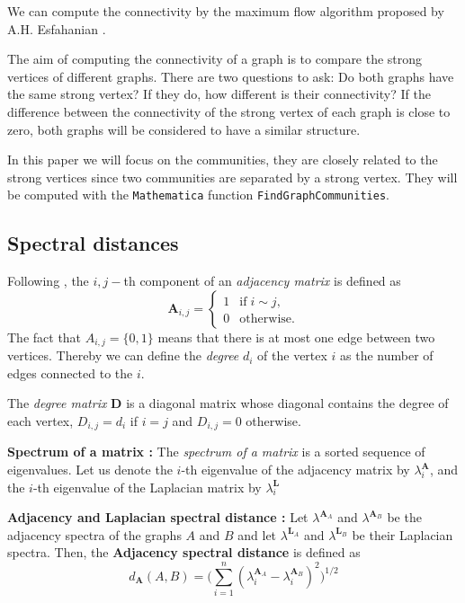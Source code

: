 \documentclass[english, 12pt]{article}
\begin{document}
We can compute the connectivity by the maximum flow algorithm proposed by A.H. Esfahanian \cite[Algorithm 11]{2013Esfahanian}.

The aim of computing the connectivity of a graph is to compare the strong vertices of different graphs. There are two questions to ask:
Do both graphs have the same strong vertex? If they do, how different is their connectivity?
If the difference between the connectivity of the strong vertex of each graph is close to zero, both graphs will be considered to have a similar structure.

In this paper we will focus on the communities, they are closely related to the strong vertices since two communities are separated by a strong vertex. They will be computed with the \texttt{Mathematica} function \texttt{FindGraphCommunities}.

\subsection{Spectral distances}

Following \cite{2020Wills}, the $i,j-$th component of an {\it adjacency matrix} is defined as
$$\mathbf A_{i,j} = \begin{cases}1&\text{if}\; i\sim j,\\0&\text{otherwise.}\end{cases}$$
The fact that $A_{i,j} = \{0,1\}$ means that there is at most one edge between two vertices. Thereby we can define the {\it degree} $d_i$ of the vertex $i$ as the number of edges connected to the $i$.

The {\it degree matrix} $\mathbf D$ is a diagonal matrix whose diagonal contains the degree of each vertex, $ D_{i,j} = d_{i}$ if $i = j$ and $ D_{i,j}  = 0$ otherwise.

{\bf Spectrum of a matrix :} The {\it spectrum of a matrix} is a sorted sequence of eigenvalues.
Let us denote the $i$-th eigenvalue of the adjacency matrix by $\lambda_i^{\mathbf A}$, and the $i$-th eigenvalue of the Laplacian matrix by $\lambda_i^{\mathbf L}$

{\bf Adjacency and Laplacian spectral distance :} Let $\lambda^{\mathbf A_A}$ and  $\lambda^{\mathbf A_B}$ be the adjacency spectra of the graphs $A$ and $B$ and let $\lambda^{\mathbf L_A}$ and  $\lambda^{\mathbf L_B}$ be their Laplacian spectra.
Then, the {\bf Adjacency spectral distance} is defined as
$$d_{\mathbf A}(A,B) = \Bigg( \sum_{i=1}^n (\lambda_i^{\mathbf A_A} - \lambda_i^{\mathbf A_B})^2\Bigg)^{1/2}$$
\end{document}
